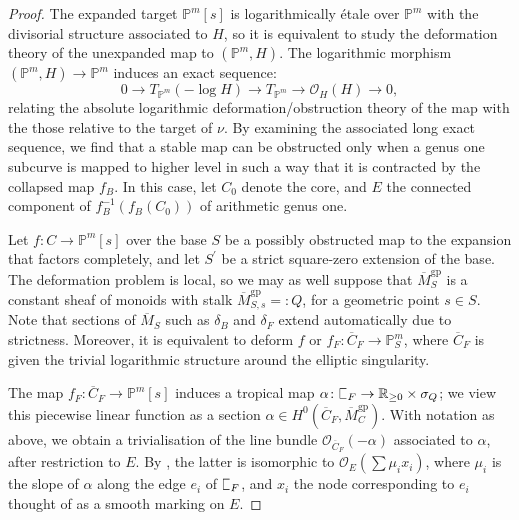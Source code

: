 \documentclass[11pt]{amsart}
\newcommand{\plC}{\scalebox{0.8}[1.3]{$\sqsubset$}}
\newcommand{\PP}{\mathbb P}
\newcommand{\OO}{\mathcal{O}}
\renewcommand{\to}{\rightarrow}
\newcommand{\RR}{\mathbb{R}}
\theoremstyle{definition}
\theoremstyle{definition}
\begin{document}
\begin{proof}
The expanded target $\PP^m[s]$ is logarithmically \'etale over $\PP^m$ with the divisorial structure associated to $H$, so it is equivalent to study the deformation theory of the unexpanded map to $(\PP^m,H)$. The logarithmic morphism $(\PP^m,H)\to \PP^m$ induces an exact sequence:
\[0\to T_{\PP^m}(-\operatorname{log}H)\to T_{\PP^m}\to\OO_H(H)\to 0,\]
relating the absolute logarithmic deformation/obstruction theory of the map with the those relative to the target of $\nu$. By examining the associated long exact sequence, we find that a stable map can be obstructed only when a genus one subcurve is mapped to higher level in such a way that it is contracted by the collapsed map $f_B$. In this case, let $C_0$ denote the core, and $E$ the connected component of $f_B^{-1}(f_B(C_0))$ of arithmetic genus one.

Let $f\colon C\to\PP^m[s]$ over the base $S$ be a possibly obstructed map to the expansion that factors completely, and let $S^\prime$ be a strict square-zero extension of the base.  The deformation problem is local, so we may as well suppose that $\overline M_S^{\text{gp}}$ is a constant sheaf of monoids with stalk $\overline M_{S,s}^{\text{gp}}=:Q$, for a geometric point $s\in S$. Note that sections of $\overline M_S$ such as $\delta_B$ and $\delta_F$ extend automatically due to strictness. Moreover, it is equivalent to deform $f$ or $f_F\colon\overline C_F\to\PP^m_S$, where $\overline C_F$ is given the trivial logarithmic structure around the elliptic singularity.

The map $f_F\colon \overline C_F\to\PP^m[s]$ induces a tropical map $\alpha\colon\plC_F\to\RR_{\geq 0}\times\sigma_Q$; we view this piecewise linear function as a section $\alpha\in H^0(\overline C_F,\overline M_C^{\text{gp}})$. With notation as above, we obtain a trivialisation of the line bundle $\OO_{\overline C_F}(-\alpha)$ associated to $\alpha$, after restriction to $E$. By \cite[Proposition 2.4.1]{RSPW}, the latter is isomorphic to $\OO_E(\sum\mu_i x_i)$, where $\mu_i$ is the slope of $\alpha$ along the edge $e_i$ of $\plC_F$, and $x_i$ the node corresponding to $e_i$ thought of as a smooth marking on $E$. 


\end{proof}
\end{document}
